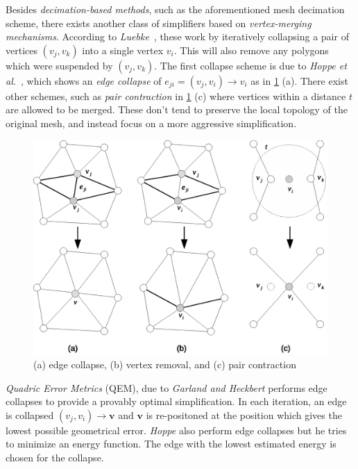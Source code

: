 Besides \emph{decimation-based methods}, such as the aforementioned mesh decimation scheme, there exists another class of simplifiers based on \emph{vertex-merging mechanisms}. According to \emph{Luebke}~\cite{luebke2001developer}, these work by iteratively collapsing a pair of vertices \((v_j, v_k)\) into a single vertex \(v_i\). This will also remove any polygons which were suspended by \((v_j, v_k)\). The first collapse scheme is due to \emph{Hoppe et al.}~\cite{hoppe1993mesh}, which shows an \emph{edge collapse} of \(e_{ji} = (v_j, v_i) \rightarrow v_i\) as in \cref{fig:mesh_transformations} (a). There exist other schemes, such as \emph{pair contraction} in \cref{fig:mesh_transformations} (c) where vertices within a distance $t$ are allowed to be merged. These don't tend to preserve the local topology of the original mesh, and instead focus on a more aggressive simplification.

\begin{figure}[h]
    \centering
    \includegraphics[width=\textwidth]{figures/mesh_transformations.eps}
    \caption{(a) edge collapse, (b) vertex removal, and (c) pair contraction}
    \label{fig:mesh_transformations}
\end{figure}

\emph{Quadric Error Metrics} (QEM), due to \emph{Garland and Heckbert} \cite{garland1997surface} performs edge collapses to provide a provably optimal simplification. In each iteration, an edge is collapsed \((v_j, v_i) \rightarrow \mathbf{v}\) and \(\mathbf{v}\) is re-positoned at the position which gives the lowest possible geometrical error. \emph{Hoppe} \cite{hoppe1996progressive} also perform edge collapses but he tries to minimize an energy function. The edge with the lowest estimated energy is chosen for the collapse. 


